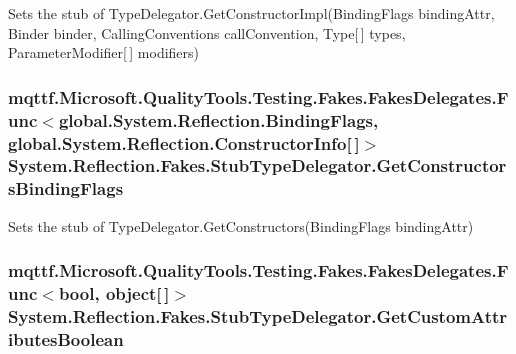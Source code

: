 Sets the stub of Type\-Delegator.\-Get\-Constructor\-Impl(\-Binding\-Flags binding\-Attr, Binder binder, Calling\-Conventions call\-Convention, Type\mbox{[}$\,$\mbox{]} types, Parameter\-Modifier\mbox{[}$\,$\mbox{]} modifiers)

\hypertarget{class_system_1_1_reflection_1_1_fakes_1_1_stub_type_delegator_a93a7fa3b485a9d33e36699b01fdb00b5}{
\subsubsection[{Get\-Constructors\-Binding\-Flags}]{\setlength{\rightskip}{0pt plus 5cm}mqttf.\-Microsoft.\-Quality\-Tools.\-Testing.\-Fakes.\-Fakes\-Delegates.\-Func$<$global.\-System.\-Reflection.\-Binding\-Flags, global.\-System.\-Reflection.\-Constructor\-Info\mbox{[}$\,$\mbox{]}$>$ System.\-Reflection.\-Fakes.\-Stub\-Type\-Delegator.\-Get\-Constructors\-Binding\-Flags}}\label{class_system_1_1_reflection_1_1_fakes_1_1_stub_type_delegator_a93a7fa3b485a9d33e36699b01fdb00b5}


Sets the stub of Type\-Delegator.\-Get\-Constructors(\-Binding\-Flags binding\-Attr)

\hypertarget{class_system_1_1_reflection_1_1_fakes_1_1_stub_type_delegator_a21e4f627f669c2def106c75364743f4b}{
\subsubsection[{Get\-Custom\-Attributes\-Boolean}]{\setlength{\rightskip}{0pt plus 5cm}mqttf.\-Microsoft.\-Quality\-Tools.\-Testing.\-Fakes.\-Fakes\-Delegates.\-Func$<$bool, object\mbox{[}$\,$\mbox{]}$>$ System.\-Reflection.\-Fakes.\-Stub\-Type\-Delegator.\-Get\-Custom\-Attributes\-Boolean}}\label{class_system_1_1_reflection_1_1_fakes_1_1_stub_type_delegator_a21e4f627f669c2def106c75364743f4b}


